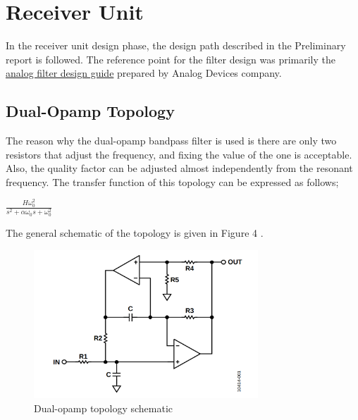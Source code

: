 \documentclass[letterpaper,12pt]{article}
\begin{document}
\section{Receiver Unit}
In the receiver unit design phase, the design path described in the Preliminary report is followed. The reference point for the filter design was primarily the \href{https://www.analog.com/media/en/training-seminars/design-handbooks/basic-linear-design/chapter8.pdf}{analog filter design guide} prepared by Analog Devices company.
\subsection{Dual-Opamp Topology}
The reason why the dual-opamp bandpass filter is used is there are only two resistors that adjust the frequency, and fixing the value of the one is acceptable. Also, the quality factor can be adjusted almost independently from the resonant frequency. The transfer function of this topology can be expressed as follows;
\begin{center}
    $ \frac{H \omega_0^2 }{s^2 + \alpha \omega_0 s + \omega_0 ^2} $
    
\end{center}
The general schematic of the topology is given in Figure 4 .
\begin{figure}[H]
    \centering
    \includegraphics[width = 0.75\textwidth]{dualopamp.png}
    \caption{Dual-opamp topology schematic}
\end{figure} 
\end{document}
